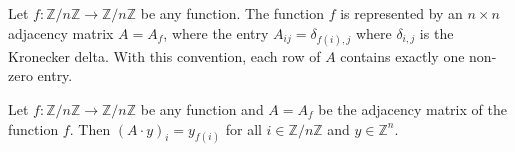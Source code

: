 %
%
%
%
%

\begin{definition}
\label{def:func_matrix}
\leanok
Let $f: \mathbb{Z}/n\mathbb{Z} \to \mathbb{Z}/n\mathbb{Z}$ be any function. The function $f$ is represented by an 
$n \times n$ adjacency matrix $A=A_f$, where the entry 
$A_{ij} = \delta_{f(i),j}$ 
where $\delta_{i,j}$ is the Kronecker delta.
With this convention, each row of $A$ contains exactly one non-zero entry.
\end{definition}

\begin{lemma}
\label{lem:func_matrix_eq}
\leanok
Let $f: \mathbb{Z}/n\mathbb{Z} \to \mathbb{Z}/n\mathbb{Z}$ be any function and $A=A_f$ be the adjacency matrix of the function $f$. 
Then $(A\cdot y)_i = y_{f(i)}$ for all $i\in \mathbb{Z}/n\mathbb{Z}$ and $y\in \mathbb{Z}^n$.
\end{lemma}

